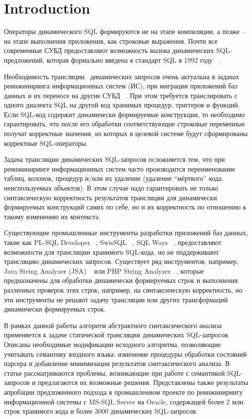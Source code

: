 \documentclass{llncs}
\begin{document}
\section{Introduction}
%
Операторы динамического SQL формируются не на этапе компиляции, а позже -- на этапе выполнения приложения, как строковые выражения. Почти все современные СУБД предоставляют возможность вызова динамических SQL-предложений, которая формально введена в стандарт SQL в 1992 году ~\cite{ISO}.

Необходимость трансляции~\cite{mart} динамических запросов очень актуальна в задачах реинжиниринга информационных систем (ИС), при миграции приложений баз данных и их переносе на другие СУБД ~\cite{NetDbTransform}. При этом требуется транслировать с одного диалекта SQL на другой код хранимых процедур, триггеров и функций. Если SQL-код содержит  динамически формируемые конструкции, то необходимо гарантировать, что после его обработки соответствующие строковые переменные получат корректные значения, из которых в целевой системе будут сформированы корректные SQL-операторы.

Задача трансляции динамических SQL-запросов осложняется тем, что при реинжиниринге информационных систем часто производится переименование таблиц, колонок, процедур и/или их удаление (удаление “мёртвого” кода, неиспользуемых объектов). В этом случае надо гарантировать не только синтаксическую корректность результатов трансляции для динамически формируемых конструкций самих по себе, но и их корректность по отношению к такому изменению их контекста.

Существующие промышленные инструменты разработки приложений баз данных, такие как PL-SQL Developer ~\cite{PLSQL}, SwisSQL ~\cite{SwissSQL}, SQL Ways ~\cite{SQLWays}, предоставляют возможности для трансляции хранимого SQL-кода, но не поддерживают трансляцию динамических запросов. Существует ряд инструментов, например, Java String Analyzer (JSA) ~\cite{JSA} или PHP String Analyzer ~\cite{PHPSA}, которые предназначены для обработки динамически формируемых строк и выполнения различных проверок этих строк, например, на синтаксическую корректность, но эти инструменты не решают задачу трансляции или других трансформаций динамически формируемых строк.

В рамках данной работы алгоритм абстрактного синтаксического анализа ~\cite{AbstrParsing} применяется к задаче статической трансляции динамических SQL-запросов. Описаны необходимые модификации исходного алгоритма, позволяющие учитывать семантику входного языка: изменение процедуры обработки состояний парсера и добавление минимизации результатов синтаксического анализа. В статье рассматриваются проблемы, возникающие при работе с семантикой SQL-запросов и предлагаются их возможные решения. Представлены также результаты апробации предложенного подхода в промышленном проекте по реинжинирингу  информационной системы с MS-SQL Server на Oracle, содержащей более 2 млн. строк хранимого кода и более 3000 динамических SQL-запросов.
\end{document}
